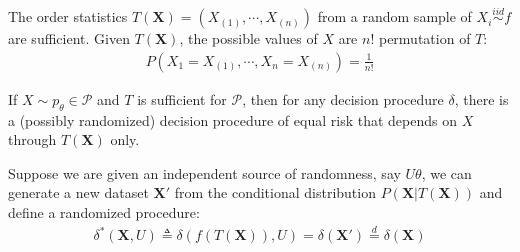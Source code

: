 \begin{example}
    The order statistics $T(\boldsymbol{X})=(X_{(1)},\cdots,X_{(n)})$ 
    from a random sample of $X_i\overset{iid}{\sim}f$ are sufficient.
    Given $T(\boldsymbol{X})$, the possible values of $X$ are $n!$ permutation of $T$:
    \begin{gather}
        P(X_1=X_{(1)},\cdots,X_n=X_{(n)})=\frac{1}{n!}
    \end{gather}
\end{example}


\begin{theorem}
    If $X\sim p_\theta\in\mathcal{P}$ and $T$ is sufficient for $\mathcal{P}$,
    then for any decision procedure $\delta$,
    there is a (possibly randomized) decision procedure of equal risk that depends on $X$ through $T(\boldsymbol{X})$ only.
\end{theorem}

\begin{note}
    Suppose we are given an independent source of randomness, 
    say $U$$\theta$, we can generate a new dataset $\boldsymbol{X}'$ 
    from the conditional distribution $P(\boldsymbol{X}|T(\boldsymbol{X}))$ and define a randomized procedure:
    \begin{align}
        \delta^*(\boldsymbol{X},U)\triangleq\delta(f(T(\boldsymbol{X})),U)
        =\delta(\boldsymbol{X}')\overset{d}{=}\delta(\boldsymbol{X})
    \end{align}
\end{note}


